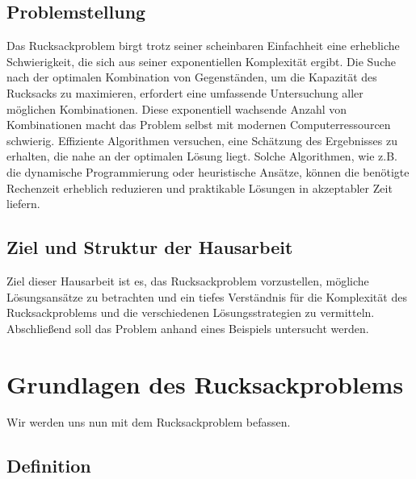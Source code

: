 \documentclass[12pt]{report}
\begin{document}
\section{Problemstellung}
Das Rucksackproblem birgt trotz seiner scheinbaren Einfachheit eine erhebliche Schwierigkeit, die sich aus seiner exponentiellen Komplexität ergibt. Die Suche nach der optimalen Kombination von Gegenständen, um die Kapazität des Rucksacks zu maximieren, erfordert eine umfassende Untersuchung aller möglichen Kombinationen. Diese exponentiell wachsende Anzahl von Kombinationen macht das Problem selbst mit modernen Computerressourcen schwierig. Effiziente Algorithmen versuchen, eine Schätzung des Ergebnisses zu erhalten, die nahe an der optimalen Lösung liegt. Solche Algorithmen, wie z.B. die dynamische Programmierung oder heuristische Ansätze, können die benötigte Rechenzeit erheblich reduzieren und praktikable Lösungen in akzeptabler Zeit liefern.  

\section{Ziel und Struktur der Hausarbeit}
Ziel dieser Hausarbeit ist es, das Rucksackproblem vorzustellen, mögliche Lösungsansätze zu betrachten und ein tiefes Verständnis für die Komplexität des Rucksackproblems und die verschiedenen Lösungsstrategien zu vermitteln. Abschließend soll das Problem anhand eines Beispiels untersucht werden.

\newpage
\chapter{Grundlagen des Rucksackproblems}
Wir werden uns nun mit dem Rucksackproblem befassen.

\section{Definition}
\end{document}
